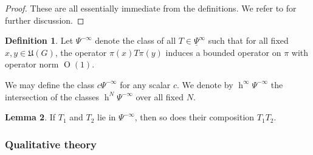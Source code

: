 \documentclass[reqno]{amsart}
\DeclareMathOperator{\h}{h}
\def\O{\operatorname{O}}
\theoremstyle{plain} \newtheorem{theorem} {Theorem}
\theoremstyle{definition} \newtheorem{definition} [theorem] {Definition}
\theoremstyle{itplain} %
\newtheorem{lemma}[theorem]{Lemma}
\numberwithin{equation}{section}
\numberwithin{theorem}{section}
\begin{document}
\begin{proof}
  These are all essentially immediate from the definitions.  We refer to \cite[\S3]{nelson-venkatesh-1} for further discussion.
\end{proof}
\begin{definition}
  Let $\Psi^{-\infty}$ denote the class of all $T \in \underline{\Psi }^\infty$ such that for all fixed $x,y \in \mathfrak{U}(G)$, the operator $\pi(x) T \pi(y)$ induces a bounded operator on $\pi$ with operator norm $\O(1)$.
  
  We may define the class $c \Psi^{-\infty}$ for any scalar $c$.  We denote by $\h^\infty \Psi^{-\infty}$ the intersection of the classes $\h^N \Psi^{-\infty}$ over all fixed $N$.    
\end{definition}

\begin{lemma}
  If $T_1$ and $T_2$ lie in  $\Psi^{-\infty}$, then so does their composition $T_1 T_2$.
\end{lemma}




\subsubsection{Qualitative theory}
\end{document}
